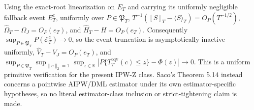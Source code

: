 Using the exact-root linearization on \(E_T\) and carrying its uniformly negligible fallback event \(E_T^c\), uniformly over \(P\in\mathfrak P_T\), \(T^{-1}([S]_T-\langle S\rangle_T)=O_P(T^{-1/2})\), \(\widehat\Omega_T-\Omega_J=O_P(e_T)\), and \(\widehat H_T-H=O_P(e_T)\). Consequently \(\sup_{P\in\mathfrak P_T}P(\mathcal E_T^c)\to0\), so the event truncation is asymptotically inactive uniformly, \(\widehat V_T-V_J=O_P(e_T)\), and \(\sup_{P\in\mathfrak P_T}\sup_{\|c\|_2=1}\sup_{z\in\mathbb R}|P\{T_T^{\mathrm{rqv}}(c)\le z\}-\Phi(z)|\to0\). This is a uniform primitive verification for the present IPW-Z class. Saco's Theorem 5.14 instead concerns a pointwise AIPW/DML estimator under its own estimator-specific hypotheses, so no literal estimator-class inclusion or strict-tightening claim is made.